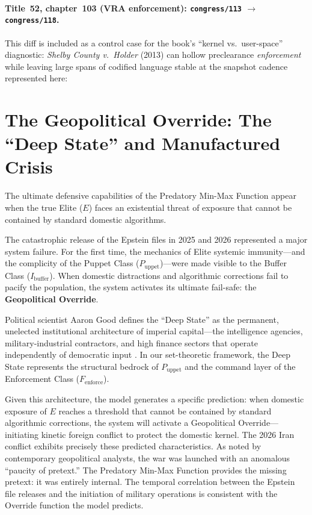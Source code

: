 \paragraph{Title~52, chapter~103 (VRA enforcement): \texttt{congress/113} $\rightarrow$ \texttt{congress/118}.}
This diff is included as a control case for the book's ``kernel vs.\ user-space'' diagnostic: \textit{Shelby County v.\ Holder} (2013) can hollow preclearance \emph{enforcement} while leaving large spans of codified language stable at the snapshot cadence represented here:

\section{The Geopolitical Override: The ``Deep State'' and Manufactured Crisis}

The ultimate defensive capabilities of the Predatory Min-Max Function appear when the true Elite ($E$) faces an existential threat of exposure that cannot be contained by standard domestic algorithms.

The catastrophic release of the Epstein files in 2025 and 2026 represented a major system failure. For the first time, the mechanics of Elite systemic immunity---and the complicity of the Puppet Class ($P_{\text{uppet}}$)---were made visible to the Buffer Class ($I_{\text{buffer}}$). When domestic distractions and algorithmic corrections fail to pacify the population, the system activates its ultimate fail-safe: the \textbf{Geopolitical Override}.

Political scientist Aaron Good defines the ``Deep State'' as the permanent, unelected institutional architecture of imperial capital---the intelligence agencies, military-industrial contractors, and high finance sectors that operate independently of democratic input \cite{good}. In our set-theoretic framework, the Deep State represents the structural bedrock of $P_{\text{uppet}}$ and the command layer of the Enforcement Class ($F_{\text{enforce}}$).

Given this architecture, the model generates a specific prediction: when domestic exposure of $E$ reaches a threshold that cannot be contained by standard algorithmic corrections, the system will activate a Geopolitical Override---initiating kinetic foreign conflict to protect the domestic kernel. The 2026 Iran conflict exhibits precisely these predicted characteristics. As noted by contemporary geopolitical analysts, the war was launched with an anomalous ``paucity of pretext.'' The Predatory Min-Max Function provides the missing pretext: it was entirely internal. The temporal correlation between the Epstein file releases and the initiation of military operations is consistent with the Override function the model predicts.

